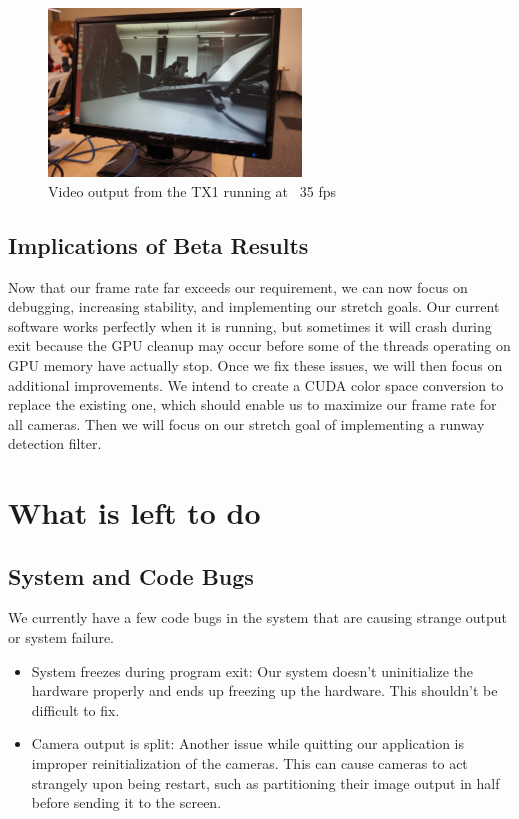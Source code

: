 \documentclass[letterpaper,10pt,titlepage]{IEEEtran}
\begin{document}
\begin{figure}[!ht]
  \caption{Video output from the TX1 running at ~35 fps}
	  \centering
		    \includegraphics[width=0.6\textwidth]{images/exampleOutputNormalBeta.jpg}
				\end{figure}
  
  \subsection{Implications of Beta Results}
  Now that our frame rate far exceeds our requirement, we can now focus on debugging, increasing stability, and implementing our stretch goals. Our current software works perfectly when it is running, but sometimes it will crash during exit because the GPU cleanup may occur before some of the threads operating on GPU memory have actually stop. Once we fix these issues, we will then focus on additional improvements. We intend to create a CUDA color space conversion to replace the existing one, which should enable us to maximize our frame rate for all cameras. Then we will focus on our stretch goal of implementing a runway detection filter.

\section{What is left to do}
	\subsection{System and Code Bugs}
	We currently have a few code bugs in the system that are causing strange output or system failure.\\
	\begin{itemize}
		\item System freezes during program exit: Our system doesn't uninitialize the hardware properly and ends up freezing up the hardware. This shouldn't be difficult to fix.
		\item Camera output is split: Another issue while quitting our application is improper reinitialization of the cameras. This can cause cameras to act strangely upon being restart, such as partitioning their image output in half before sending it to the screen.
	\end{itemize}
	
\end{document}
